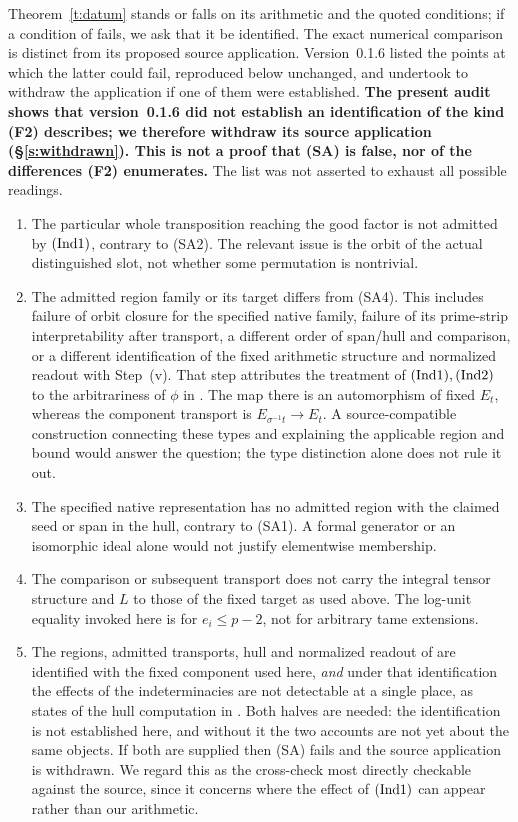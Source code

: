 \documentclass[11pt]{article}
\theoremstyle{plain}
\theoremstyle{definition}
\newcommand{\Ind}[1]{\textup{(Ind#1)}}
\newcommand{\SA}{\textup{(SA)}}
\begin{document}
Theorem~\ref{t:datum} stands or falls on its arithmetic and the quoted
conditions; if a condition of \cite[Def.~3.1]{IUT1} fails, we ask that it
be identified.  The exact numerical comparison is distinct from its proposed
source application.  Version~0.1.6 listed the points at which the latter could
fail, reproduced below unchanged, and undertook to withdraw the application if
one of them were established.  \textbf{The present audit shows that
version~0.1.6 did not establish an identification of the kind \textup{(F2)}
describes; we therefore withdraw its source application (\S\ref{s:withdrawn}).  This is not
a proof that \SA{} is false, nor of the differences \textup{(F2)} enumerates.}
The list was not asserted to exhaust all possible readings.
\begin{enumerate}[label=(F\arabic*),leftmargin=3.0em,itemsep=2pt]
\item The particular whole transposition reaching the good factor is not
 admitted by $\Ind1$, contrary to (SA2).  The relevant issue is the orbit
 of the actual distinguished slot, not whether some permutation is nontrivial.
\item The admitted region family or its target differs from (SA4).
 This includes failure of orbit closure for the specified native family,
 failure of its prime-strip interpretability after transport, a different
 order of span/hull and comparison, or a different identification of the
 fixed arithmetic structure and normalized readout with Step~(v).
 That step attributes the treatment of $\Ind1,\Ind2$ to the arbitrariness
 of $\phi$ in \cite[Prop.~1.2]{IUT4}.  The map there is an automorphism
 of fixed $E_t$, whereas the component transport is
 $E_{\sigma^{-1}t}\to E_t$.  A source-compatible construction connecting
 these types and explaining the applicable region and bound would answer
 the question; the type distinction alone does not rule it out.
\item The specified native representation has no admitted region with the
 claimed seed or span in the hull, contrary to (SA1).  A formal generator
 or an isomorphic ideal alone would not justify elementwise membership.
\item The comparison or subsequent transport does not carry the integral
 tensor structure and $L$ to those of the fixed target as used above.
 The log-unit equality invoked here is for $e_i\le p-2$, not for arbitrary
 tame extensions.
\item The regions, admitted transports, hull and normalized readout of
 \cite[\S9.2, \S10.4]{LANA} are identified with the fixed component used here,
 \emph{and} under that identification the effects of the indeterminacies are not
 detectable at a single place, as \cite[\S10.4]{LANA} states of the hull
 computation in \cite{IUT4}.  Both halves are needed: the identification is not
 established here, and without it the two accounts are not yet about the same
 objects.  If both are supplied then \SA{} fails and the source application is
 withdrawn.  We regard this as the cross-check most directly checkable against the
 source, since it concerns where the effect of $\Ind1$ can appear rather than our
 arithmetic.
\end{enumerate}
\end{document}

